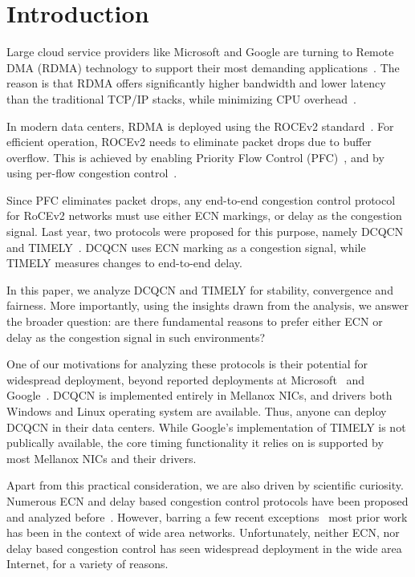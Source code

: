 \section{Introduction}

Large cloud service providers like Microsoft and Google are turning to Remote
DMA (RDMA) technology to support their most demanding
applications~\cite{dcqcn,timely,tcp-bolt,erasure-storage,farm,pilaf}.  The
reason is that RDMA offers significantly higher bandwidth and lower latency than
the traditional TCP/IP stacks, while minimizing CPU
overhead~\cite{dcqcn,farm,timely}. 

In modern data centers, RDMA is deployed using the ROCEv2 standard~\cite{rocev2}.
For efficient operation, ROCEv2 needs to eliminate packet drops due to buffer
overflow. This is achieved by enabling Priority Flow Control (PFC)~\cite{pfc},
and by using per-flow congestion control~\cite{dcqcn,timely}. 

Since PFC eliminates packet drops, any end-to-end congestion control protocol
for RoCEv2 networks must use either ECN markings, or delay as the congestion
signal. Last year, two protocols were proposed for this purpose, namely
DCQCN~\cite{dcqcn} and TIMELY~\cite{timely}. DCQCN uses ECN marking as a
congestion signal, while TIMELY measures changes to end-to-end delay.


In this paper, we analyze DCQCN and TIMELY for stability, convergence and
fairness. More importantly, using the insights drawn from the analysis, we
answer the broader question: are there fundamental reasons to prefer either ECN
or delay as the congestion signal in such environments?


One of our motivations for analyzing these protocols is their potential for
widespread deployment, beyond reported deployments at Microsoft~\cite{dcqcn} and
Google~\cite{timely}. DCQCN is implemented entirely in Mellanox NICs, and
drivers both Windows and Linux operating system are available. Thus, anyone can
deploy DCQCN in their data centers. While Google's implementation of TIMELY is
not publically available, the core timing functionality it relies on is
supported by most Mellanox NICs and their drivers. 

Apart from this practical consideration, we are also driven by
scientific curiosity. Numerous ECN and delay based congestion control protocols
have been proposed and analyzed before~\cite{ecn, tcp-vegas,
Hollot:PIController,misra2000fluid,hollot2001designing,misra:TAC2002,gorinsky2004feedback}.
However, barring a few recent exceptions~\cite{dctcp-analysis, qcn-analysis}
most prior work has been in the context of wide area networks.  Unfortunately,
neither ECN, nor delay based congestion control has seen widespread
deployment in the wide area Internet, for a variety of reasons. 

